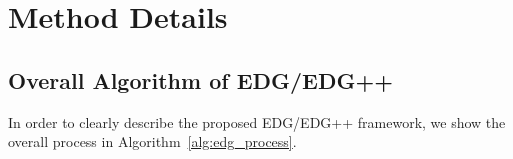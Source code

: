 \section{Method Details}
\label{sec:appendix_method_details}

\subsection{Overall Algorithm of EDG/EDG++}
\label{sec:appendix_algorithm}

In order to clearly describe the proposed EDG/EDG++ framework, we show the overall process in Algorithm~\ref{alg:edg_process}.

